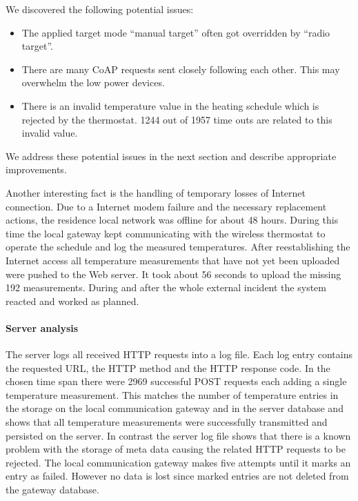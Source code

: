 We discovered the following potential issues:
\begin{itemize}
	\item The applied target mode ``manual target'' often got overridden by ``radio target''.
	\item There are many CoAP requests sent closely following each other. This may overwhelm the low power devices.
	\item There is an invalid temperature value in the heating schedule which is rejected by the thermostat. 1244 out of 1957 time outs are related to this invalid value.
\end{itemize}

We address these potential issues in the next section and describe appropriate improvements.

Another interesting fact is the handling of temporary losses of Internet connection.
Due to a Internet modem failure and the necessary replacement actions, the residence local network was offline for about 48 hours.
During this time the local gateway kept communicating with the wireless thermostat to operate the schedule and log the measured temperatures.
After reestablishing the Internet access all temperature measurements that have not yet been uploaded were pushed to the Web server.
It took about 56 seconds to upload the missing 192 measurements.
During and after the whole external incident the system reacted and worked as planned.

\paragraph{Server analysis}


The server logs all received HTTP requests into a log file.
Each log entry contains the requested URL, the HTTP method and the HTTP response code.
In the chosen time span there were 2969 successful POST requests each adding a single temperature measurement.
This matches the number of temperature entries in the storage on the local communication gateway and in the server database and shows that all temperature measurements were successfully transmitted and persisted on the server.
In contrast the server log file shows that there is a known problem with the storage of meta data causing the related HTTP requests to be rejected.
The local communication gateway makes five attempts until it marks an entry as failed.
However no data is lost since marked entries are not deleted from the gateway database.




